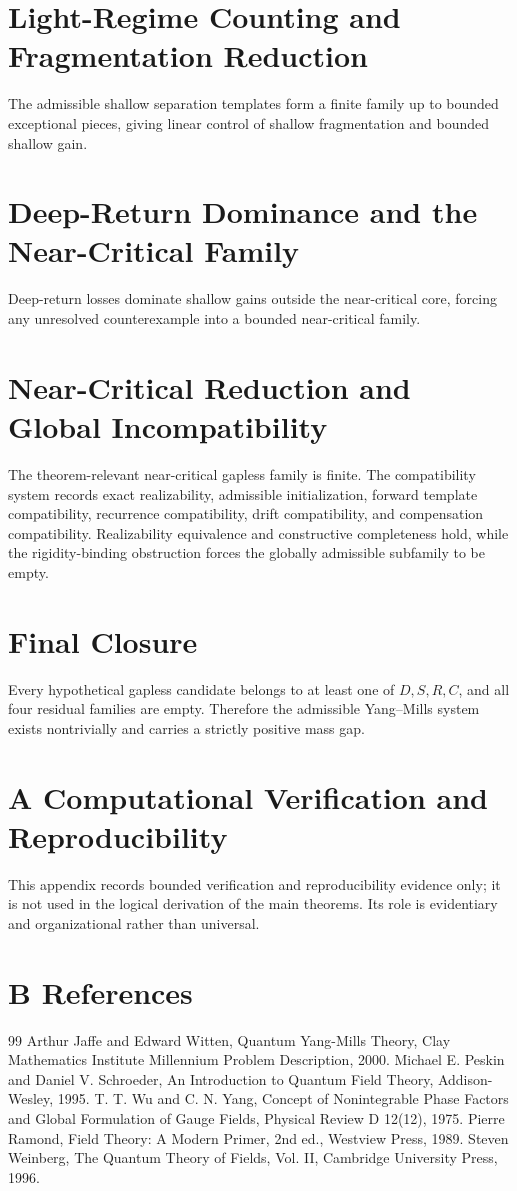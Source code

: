 \documentclass[11pt]{article}
\theoremstyle{definition}
\begin{document}
\section{Light-Regime Counting and Fragmentation Reduction}
The admissible shallow separation templates form a finite family up to bounded exceptional pieces, giving linear control of shallow fragmentation and bounded shallow gain.
\section{Deep-Return Dominance and the Near-Critical Family}
Deep-return losses dominate shallow gains outside the near-critical core, forcing any unresolved counterexample into a bounded near-critical family.
\section{Near-Critical Reduction and Global Incompatibility}
The theorem-relevant near-critical gapless family is finite. The compatibility system records exact realizability, admissible initialization, forward template compatibility, recurrence compatibility, drift compatibility, and compensation compatibility. Realizability equivalence and constructive completeness hold, while the rigidity-binding obstruction forces the globally admissible subfamily to be empty.
\section{Final Closure}
Every hypothetical gapless candidate belongs to at least one of $D,S,R,C$, and all four residual families are empty. Therefore the admissible Yang--Mills system exists nontrivially and carries a strictly positive mass gap.

\section*{A Computational Verification and Reproducibility}
This appendix records bounded verification and reproducibility evidence only; it is not used in the logical derivation of the main theorems. Its role is evidentiary and organizational rather than universal.

\section*{B References}
\begin{thebibliography}{99}
 Arthur Jaffe and Edward Witten, Quantum Yang-Mills Theory, Clay Mathematics Institute Millennium Problem Description, 2000.
 Michael E. Peskin and Daniel V. Schroeder, An Introduction to Quantum Field Theory, Addison-Wesley, 1995.
 T. T. Wu and C. N. Yang, Concept of Nonintegrable Phase Factors and Global Formulation of Gauge Fields, Physical Review D 12(12), 1975.
 Pierre Ramond, Field Theory: A Modern Primer, 2nd ed., Westview Press, 1989.
 Steven Weinberg, The Quantum Theory of Fields, Vol. II, Cambridge University Press, 1996.
\end{thebibliography}
\end{document}
